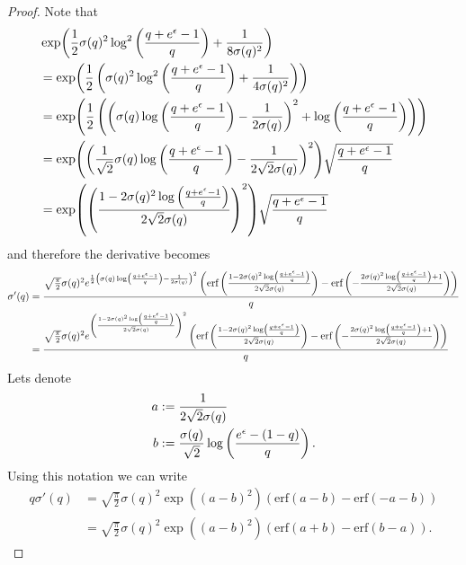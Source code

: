 \documentclass{article}
\theoremstyle{plain}
\theoremstyle{definition}
\theoremstyle{remark}
\begin{document}
\begin{proof}
Note that 
\begin{align}
    &\exp(\frac{1}{2} \sigma(q)^2 \log ^2\left(\frac{q+e^{\epsilon }-1}{q}\right)+\frac{1}{8 \sigma(q)^2}) \\
        &=\exp(\frac{1}{2} \left( \sigma(q)^2 \log ^2\left(\frac{q+e^{\epsilon }-1}{q}\right)+\frac{1}{4 \sigma(q)^2} \right) ) \\
        &=\exp(\frac{1}{2} \left( \left( \sigma(q) \log \left(\frac{q+e^{\epsilon }-1}{q}\right) - \frac{1}{2 \sigma(q)} \right)^2 + \log \left(\frac{q+e^{\epsilon }-1}{q}\right) \right) ) \\
        &=\exp(\left( \frac{1}{\sqrt{2}}\sigma(q) \log \left(\frac{q+e^{\epsilon }-1}{q}\right) - \frac{1}{2\sqrt{2} \sigma(q)} \right)^2 ) \sqrt{\frac{q+e^{\epsilon }-1}{q}} \\
        &=\exp(\left( \frac{1 - 2\sigma(q)^2\log \left(\frac{q+e^{\epsilon }-1}{q}\right)}{2\sqrt{2} \sigma(q)} \right)^2 ) \sqrt{\frac{q+e^{\epsilon }-1}{q}}
\end{align}
and therefore the derivative becomes
\begin{align}
    \sigma'(q) 
    &= \frac{\sqrt{\frac{\pi }{2}} \sigma(q)^2 e^{\frac{1}{2} \left( \sigma(q) \log \left(\frac{q+e^{\epsilon }-1}{q}\right) - \frac{1}{2 \sigma(q)} \right)^2} \left(\text{erf}\left(\frac{1-2 \sigma(q)^2 \log \left(\frac{q+e^{\epsilon }-1}{q}\right)}{2 \sqrt{2} \sigma(q)}\right)-\text{erf}\left(-\frac{2 \sigma(q)^2 \log \left(\frac{q+e^{\epsilon }-1}{q}\right)+1}{2 \sqrt{2} \sigma(q)}\right)\right)}{q} \\
    &=
    \frac{\sqrt{\frac{\pi }{2}} \sigma(q)^2 e^{\left( \frac{1  - 2\sigma(q)^2 \log \left(\frac{q+e^{\epsilon }-1}{q}\right)}{2\sqrt{2} \sigma(q)} \right)^2} \left(\text{erf}\left(\frac{1-2 \sigma(q)^2 \log \left(\frac{q+e^{\epsilon }-1}{q}\right)}{2 \sqrt{2} \sigma(q)}\right)-\text{erf}\left(-\frac{2 \sigma(q)^2 \log \left(\frac{q+e^{\epsilon }-1}{q}\right)+1}{2 \sqrt{2} \sigma(q)}\right)\right)}{q}
\end{align}
Lets denote 
\begin{align}
    a &:= \frac{1}{2\sqrt{2} \sigma(q)} \\
    b &:= \frac{\sigma(q)}{\sqrt{2}} \log \left( \frac{e^\epsilon - (1-q)}{q} \right).
\end{align}
Using this notation we can write 
\begin{align}
    q \sigma'(q) 
        &= \sqrt{\frac{\pi}{2}} \sigma(q)^2 \exp((a-b)^2) (\text{erf}(a-b) - \text{erf}(-a-b)) \\
        &= \sqrt{\frac{\pi}{2}} \sigma(q)^2 \exp((a-b)^2) (\text{erf}(a+b) - \text{erf}(b-a)).

\end{align}
\end{proof}
\end{document}
